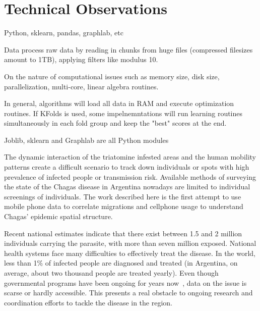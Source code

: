 \section{Technical Observations}
Python, sklearn, pandas, graphlab, etc

Data process raw data by reading in chunks from huge files (compressed filesizes amount to 1TB), applying filters like modulus 10.

On the nature of computational issues such as memory size, disk size, parallelization, multi-core, linear algebra routines.

In general, algorithms will load all data in RAM and execute optimization routines. If KFolds is used, some impelnemntations will run learning routines simultaneously in each fold group and keep the "best" scores at the end.

Joblib, sklearn and Graphlab are all Python modules



The dynamic interaction of the triatomine infested areas and the human mobility patterns create a difficult scenario to track down individuals or spots with high prevalence of infected people or transmission risk. Available methods of surveying the state of the Chagas disease in Argentina nowadays are limited to individual screenings of individuals. The work described here is the first attempt to use mobile phone data to correlate migrations and cellphone usage to understand Chagas’ epidemic spatial structure.

Recent national estimates indicate that there exist between 1.5 and 2 million individuals carrying the parasite, with more than seven million exposed. 
National health systems face many difficulties to effectively treat the disease. In the world, less than 1\% of infected people are diagnosed and treated (in Argentina, on average, about two thousand people are treated yearly). 
Even though governmental programs have been ongoing for years now~\cite{plan_nacional_chagas}, data on the issue is scarse or hardly accessible. This presents a real obstacle to ongoing research and coordination efforts to tackle the disease in the region.

